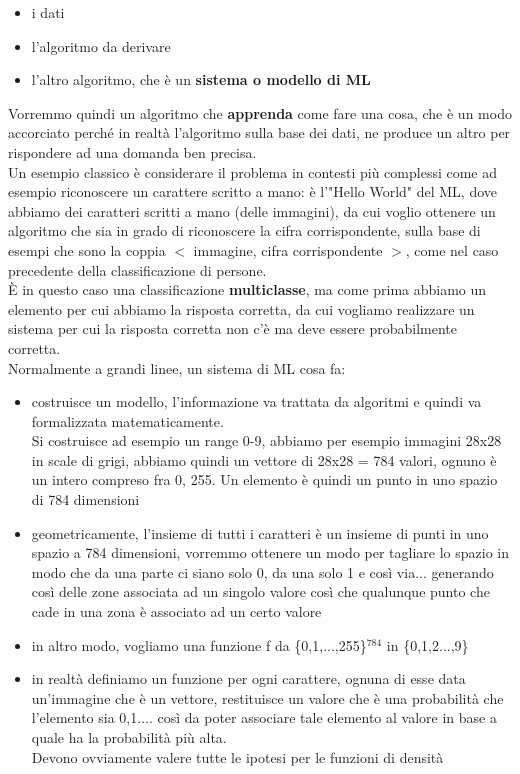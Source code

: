\documentclass[12pt, oneside]{extbook}
\begin{document}
\begin{itemize}
	\item i dati
	\item l'algoritmo da derivare
	\item l'altro algoritmo, che è un \textbf{sistema o modello di ML}
\end{itemize}
Vorremmo quindi un algoritmo che \textbf{apprenda} come fare una cosa, che è un modo accorciato perché in realtà l'algoritmo sulla base dei dati, ne produce un altro per rispondere ad una domanda ben precisa.\\Un esempio classico è considerare il problema in contesti più complessi come ad esempio riconoscere un carattere scritto a mano: è l'"Hello World" del ML, dove abbiamo dei caratteri scritti a mano (delle immagini), da cui voglio ottenere un algoritmo che sia in grado di riconoscere la cifra corrispondente, sulla base di esempi che sono la coppia $<$ immagine, cifra corrispondente $>$, come nel caso precedente della classificazione di persone.\\È in questo caso una classificazione \textbf{multiclasse}, ma come prima abbiamo un elemento per cui abbiamo la risposta corretta, da cui vogliamo realizzare un sistema per cui la risposta corretta non c'è ma deve essere probabilmente corretta.\\Normalmente a grandi linee, un sistema di ML cosa fa:
\begin{itemize}
	\item costruisce un modello, l'informazione va trattata da algoritmi e quindi va formalizzata matematicamente.\\Si costruisce ad esempio un range 0-9, abbiamo per esempio immagini 28x28 in scale di grigi, abbiamo quindi un vettore di 28x28 = 784 valori, ognuno è un intero compreso fra 0, 255. Un elemento è quindi un punto in uno spazio di 784 dimensioni
	\item geometricamente, l'insieme di tutti i caratteri è un insieme di punti in uno spazio a 784 dimensioni, vorremmo ottenere un modo per tagliare lo spazio in modo che da una parte ci siano solo 0, da una solo 1 e così via... generando così delle zone associata ad un singolo valore così che qualunque punto che cade in una zona è associato ad un certo valore
	\item in altro modo, vogliamo una funzione f da \{0,1,...,255\}$^{784}$ in \{0,1,2...,9\}
	\item in realtà definiamo un funzione per ogni carattere, ognuna di esse data un'immagine che è un vettore, restituisce un valore che è una probabilità che l'elemento sia 0,1.... così da poter associare tale elemento al valore in base a quale ha la probabilità più alta.\\Devono ovviamente valere tutte le ipotesi per le funzioni di densità
\end{itemize}
\end{document}
